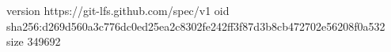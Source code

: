 version https://git-lfs.github.com/spec/v1
oid sha256:d269d560a3c776dc0ed25ea2c8302fe242ff3f87d3b8cb472702e56208f0a532
size 349692
